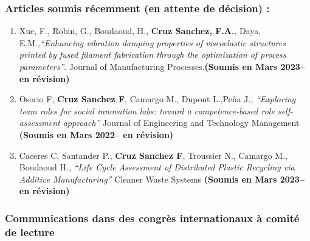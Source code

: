 \documentclass[
  11pt,
]{article}
\begin{document}
\hypertarget{articles-soumis-ruxe9cemment-en-attente-de-duxe9cision}{%
\subsubsection{Articles soumis récemment (en attente de décision)
:}\label{articles-soumis-ruxe9cemment-en-attente-de-duxe9cision}}

\begin{enumerate}
\def\labelenumi{\arabic{enumi}.}
\item
  Xue, F., Robin, G., Boudaoud, H., \textbf{Cruz Sanchez, F.A.}, Daya,
  E.M.,\emph{``Enhancing vibration damping properties of viscoelastic
  structures printed by fused filament fabrication through the
  optimization of process parameters''}. Journal of Manufacturing
  Processes.\textbf{(Soumis en Mars 2023-- en révision)}
\item
  Osorio F, \textbf{Cruz Sanchez F}, Camargo M., Dupont L.,Peña J.,
  \emph{``Exploring team roles for social innovation labs: toward a
  competence-based role self-assessment approach''} Journal of
  Engineering and Technology Management \textbf{(Soumis en Mars 2022--
  en révision)}
\item
  Caceres C, Santander P., \textbf{Cruz Sanchez F}, Troussier N.,
  Camargo M., Boudaoud H., \emph{``Life Cycle Assessment of Distributed
  Plastic Recycling via Additive Manufacturing''} Cleaner Waste Systems
  \textbf{(Soumis en Mars 2023-- en révision)}
\end{enumerate}

\hypertarget{communications-dans-des-congruxe8s-internationaux-uxe0-comituxe9-de-lecture}{%
\subsubsection{Communications dans des congrès internationaux à comité
de
lecture}\label{communications-dans-des-congruxe8s-internationaux-uxe0-comituxe9-de-lecture}}
\end{document}
